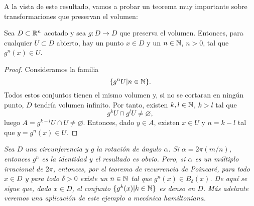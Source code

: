 A la vista de este resultado, vamos a probar un teorema muy importante sobre transformaciones que preservan el volumen:
\begin{prop}
 Sea $D\subset \mathbb{R}^n$ acotado y sea $g:D\rightarrow D$ que preserva el volumen. Entonces, para cualquier $U\subset D$ abierto, hay un punto $x\in D$ y un $n\in \mathbb{N}$, $n>0$, tal que $g^n(x) \in U$.
\end{prop}
\begin{proof}
  Consideramos la familia
  \begin{equation*}
    \{g^nU | n \in \mathbb{N} \}.
  \end{equation*}
  Todos estos conjuntos tienen el mismo volumen y, si no se cortaran en ningún punto, $D$ tendría volumen infinito. Por tanto, existen $k,l\in \mathbb{N}$, $k>l$ tal que
  \begin{equation*}
    g^kU\cap g^lU \neq \varnothing,
  \end{equation*}
  luego $A=g^{k-l}U \cap U \neq \varnothing$. Entonces, dado $y\in A$, existen $x \in U$ y $n=k-l$ tal que $y=g^n(x)\in U$.
\end{proof}
\begin{ejemplo}
  \em
  Sea $D$ una circunferencia y $g$ la rotación de ángulo $\alpha$. Si $\alpha=2\pi(m/n)$, entonces $g^n$ es la identidad y el resultado es obvio. Pero, si $\alpha$ es un múltiplo irracional de $2\pi$, entonces, por el teorema de recurrencia de Poincaré, para todo $x\in D$ y para todo $\delta>0$ existe un $n\in \mathbb{N}$ tal que $g^n(x) \in B_{\delta}(x)$.
  De aquí se sigue que, dado $x \in D$, el conjunto $\{g^k(x)|k\in \mathbb{N}\}$ es denso en $D$. Más adelante veremos una aplicación de este ejemplo a mecánica hamiltoniana.

\end{ejemplo}

